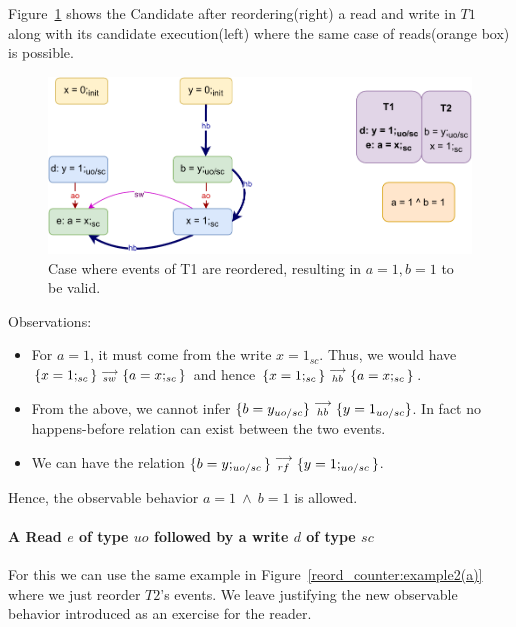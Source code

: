         Figure~\ref{reord_counter:example2(b)} shows the Candidate after reordering(right) a read and write in $T1$ along with its candidate execution(left) where the same case of reads(orange box) is possible. 
        \begin{figure}[H]
            \centering
            \includegraphics[scale=0.7]{7.CounterExamples/ReorderingCandidate/Example3R(Rsc-Wuo,sc).pdf}
            \caption{Case where events of T1 are reordered, resulting in $a = 1, b = 1$ to be valid.}
            \label{reord_counter:example2(b)}
        \end{figure}
        
        Observations:
        \begin{itemize}
            \item For $a=1$, it must come from the write $x=1_{sc}$. 
            Thus, we would have $\{x=1;_{sc}\}\stackrel{\longrightarrow}{_{sw}}\{a=x;_{sc}\}$ and hence $\{x=1;_{sc}\}\stackrel{\longrightarrow}{_{hb}}\{a=x;_{sc}\}$.
            \item From the above, we cannot infer $\{b=y_{uo/sc}\}\stackrel{\longrightarrow}{_{hb}}\{y=1_{uo/sc}\}$. In fact no happens-before relation can exist between the two events.
            \item We can have the relation $\{b=y;_{uo/sc}\}\stackrel{\longrightarrow}{_{rf}}\{y=1;_{uo/sc}\}$.
        \end{itemize}
        Hence, the observable behavior $a=1 \ \wedge \ b=1$ is allowed.
    \paragraph{A Read $e$ of type $uo$ followed by a write $d$ of type $sc$}

        For this we can use the same example in Figure~\ref{reord_counter:example2(a)} where we just reorder $T2$'s events.
        We leave justifying the new observable behavior introduced as an exercise for the reader.
    
